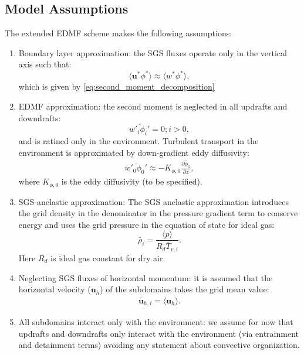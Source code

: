 \documentclass{report}
\begin{document}
\subsection{Model Assumptions} \label{sec:Model Assumptions}
The extended EDMF scheme makes the following assumptions:
\begin{enumerate}
\item Boundary layer approximation: the SGS fluxes operate only in the vertical axis such that:
\begin{equation}
\label{eq:bl_approximation} 
\langle \mathbf{u}^* \phi^* \rangle \approx \langle w^* \phi^* \rangle,
\end{equation}
which is given by \eqref{eq:second_moment_decomposition}
\item EDMF approximation: the second moment is neglected in all updrafts and downdrafts:
\begin{equation}
\label{eq:vertical_eddy_diffusivty} 
\overline{w'_i \phi_i'} = 0; i>0,
\end{equation}
and is ratined only in the environment. Turbulent transport in the environment is approximated by down-gradient eddy diffusivity:
\begin{eqnarray}
\label{eq:vertical_eddy_diffusivty} 
\overline{w'_0 \phi_0'} \approx - K_{\phi, 0} \frac{\partial \bar{\phi}_0}{\partial z},
\end{eqnarray}
where $K_{\phi,0}$ is the eddy diffusivity (to be specified). 
\item SGS-anelastic approximation: The SGS anelastic approximation introduces the grid density in the denominator in the pressure gradient term to conserve energy \cite{Pauluis08a, cohen_2020} and uses the grid pressure in the equation of state for ideal gas:
\begin{equation}
\bar{\rho}_i  = \frac{\langle p \rangle}{R_d\bar{T}_{v,i}}.
\label{eq:subdomain_eos} 
\end{equation}
Here $R_d$ is ideal gas constant for dry air.
\item Neglecting SGS fluxes of horizontal momentum: it is assumed that the horizontal velocity ($\mathbf{u}_h$) of the subdomains takes the grid mean value:
\begin{eqnarray}
    \bar{\mathbf{u}}_{h,i} = \langle \mathbf{u}_h \rangle.
\end{eqnarray}
\item All subdomains interact only with the environment: we assume for now that updrafts and downdrafts only interact with the environment (via entrainment and detainment terms) avoiding any statement about convective organization.
\end{enumerate}
\end{document}
